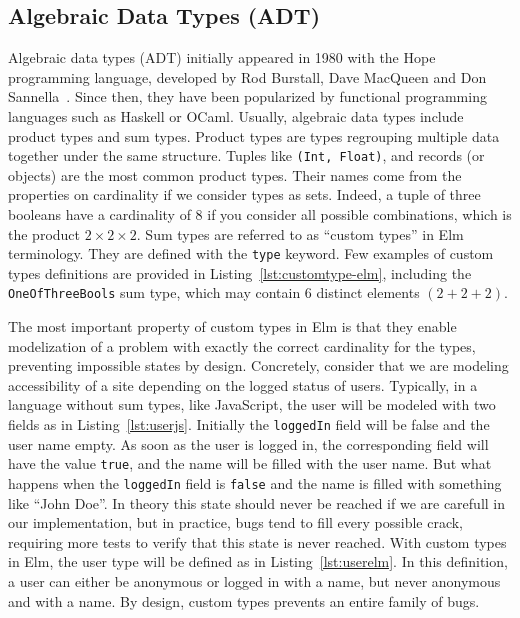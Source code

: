 


\subsection{Algebraic Data Types (ADT)}%
\label{sub:algebraic_data_types_adt_}

Algebraic data types (ADT) initially appeared in 1980 with the Hope programming language,
developed by Rod Burstall, Dave MacQueen and Don Sannella~\cite{burstall1980hope}.
Since then, they have been popularized by functional programming languages
such as Haskell or OCaml.
Usually, algebraic data types include product types and sum types.
Product types are types regrouping multiple data together under the same structure.
Tuples like \verb|(Int, Float)|, and records (or objects) are the most common product types.
Their names come from the properties on cardinality if we consider types as sets.
Indeed, a tuple of three booleans have a cardinality of 8 if you consider
all possible combinations, which is the product $2\times2\times2$.
Sum types are referred to as ``custom types'' in Elm terminology.
They are defined with the \verb|type| keyword.
Few examples of custom types definitions are provided in Listing~\ref{lst:customtype-elm},
including the \verb|OneOfThreeBools| sum type,
which may contain 6 distinct elements $(2 + 2 + 2)$.



The most important property of custom types in Elm
is that they enable modelization of a problem with exactly the correct
cardinality for the types, preventing impossible states by design.
Concretely, consider that we are modeling accessibility of a site
depending on the logged status of users.
Typically, in a language without sum types, like JavaScript,
the user will be modeled with two fields as in Listing~\ref{lst:userjs}.
Initially the \verb|loggedIn| field will be false and the user name empty.
As soon as the user is logged in,
the corresponding field will have the value \verb|true|,
and the name will be filled with the user name.
But what happens when the \verb|loggedIn| field is \verb|false| and
the name is filled with something like ``John Doe''.
In theory this state should never be reached if we are carefull in our implementation,
but in practice, bugs tend to fill every possible crack,
requiring more tests to verify that this state is never reached.
With custom types in Elm, the user type will be defined as in Listing~\ref{lst:userelm}.
In this definition, a user can either be anonymous or logged in with a name,
but never anonymous and with a name.
By design, custom types prevents an entire family of bugs.

